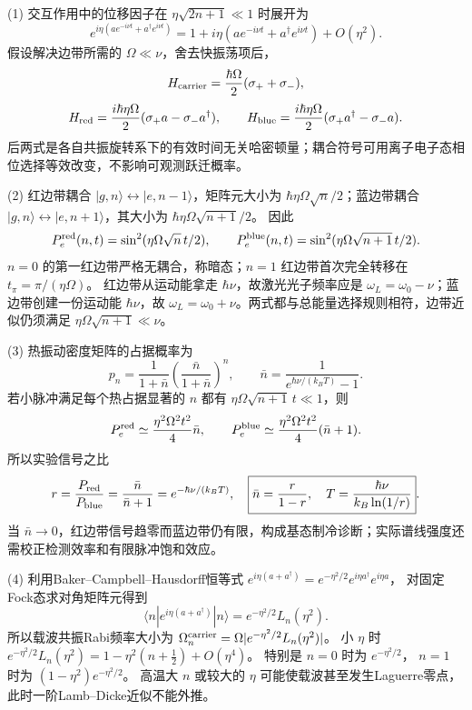 (1) 交互作用中的位移因子在 \(\eta\sqrt{2n+1}\ll1\) 时展开为
\[
e^{i\eta(ae^{-i\nu t}+a^\dagger e^{i\nu t})}
=1+i\eta(ae^{-i\nu t}+a^\dagger e^{i\nu t})+O(\eta^2).
\]
假设解决边带所需的 \(\Omega\ll\nu\)，舍去快振荡项后，
\[
H_{\rm carrier}=\frac{\hbar\Omega}{2}(\sigma_++\sigma_-),
\]
\[
H_{\rm red}=\frac{i\hbar\eta\Omega}{2}(\sigma_+a-\sigma_-a^\dagger),\qquad
H_{\rm blue}=\frac{i\hbar\eta\Omega}{2}(\sigma_+a^\dagger-\sigma_-a).
\]
后两式是各自共振旋转系下的有效时间无关哈密顿量；耦合符号可用离子电子态相位选择等效改变，不影响可观测跃迁概率。

(2) 红边带耦合 \(|g,n\rangle\leftrightarrow|e,n-1\rangle\)，矩阵元大小为
\(\hbar\eta\Omega\sqrt n/2\)；蓝边带耦合
\(|g,n\rangle\leftrightarrow|e,n+1\rangle\)，其大小为
\(\hbar\eta\Omega\sqrt{n+1}/2\)。
因此
\[
P_e^{\rm red}(n,t)=\sin^2(\eta\Omega\sqrt n\,t/2),\qquad
P_e^{\rm blue}(n,t)=\sin^2(\eta\Omega\sqrt{n+1}\,t/2).
\]
\(n=0\) 的第一红边带严格无耦合，称暗态；\(n=1\) 红边带首次完全转移在
\(t_\pi=\pi/(\eta\Omega)\)。
红边带从运动能拿走 \(\hbar\nu\)，故激光光子频率应是
\(\omega_L=\omega_0-\nu\)；蓝边带创建一份运动能 \(\hbar\nu\)，故
\(\omega_L=\omega_0+\nu\)。两式都与总能量选择规则相符，边带近似仍须满足 \(\eta\Omega\sqrt{n+1}\ll\nu\)。

(3) 热振动密度矩阵的占据概率为
\[
p_n=\frac1{1+\bar n}\left(\frac{\bar n}{1+\bar n}\right)^n,\qquad
\bar n=\frac1{e^{\hbar\nu/(k_BT)}-1}.
\]
若小脉冲满足每个热占据显著的 \(n\) 都有
\(\eta\Omega\sqrt{n+1}\,t\ll1\)，则
\[
P_e^{\rm red}\simeq\frac{\eta^2\Omega^2t^2}{4}\bar n,\qquad
P_e^{\rm blue}\simeq\frac{\eta^2\Omega^2t^2}{4}(\bar n+1).
\]
所以实验信号之比
\[
r=\frac{P_{\rm red}}{P_{\rm blue}}
=\frac{\bar n}{\bar n+1}=e^{-\hbar\nu/(k_BT)},\quad
\boxed{\bar n=\frac r{1-r},\quad
T=\frac{\hbar\nu}{k_B\ln(1/r)}}.
\]
当 \(\bar n\to0\)，红边带信号趋零而蓝边带仍有限，构成基态制冷诊断；实际谱线强度还需校正检测效率和有限脉冲饱和效应。

(4) 利用Baker–Campbell–Hausdorff恒等式
\(e^{i\eta(a+a^\dagger)}
=e^{-\eta^2/2}e^{i\eta a^\dagger}e^{i\eta a}\)，
对固定Fock态求对角矩阵元得到
\[
\boxed{\langle n|e^{i\eta(a+a^\dagger)}|n\rangle
=e^{-\eta^2/2}L_n(\eta^2)}.
\]
所以载波共振Rabi频率大小为
\(\Omega_{n}^{\rm carrier}=\Omega|e^{-\eta^2/2}L_n(\eta^2)|\)。
小 \(\eta\) 时
\(e^{-\eta^2/2}L_n(\eta^2)
=1-\eta^2(n+\tfrac12)+O(\eta^4)\)。
特别是 \(n=0\) 时为 \(e^{-\eta^2/2}\)，
\(n=1\) 时为 \((1-\eta^2)e^{-\eta^2/2}\)。
高温大 \(n\) 或较大的 \(\eta\) 可能使载波甚至发生Laguerre零点，此时一阶Lamb–Dicke近似不能外推。
